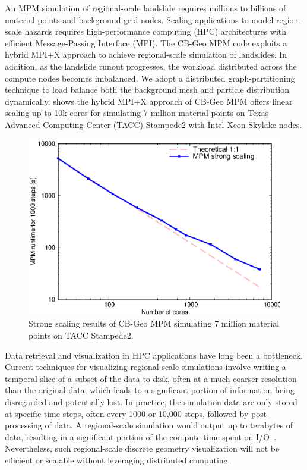 \documentclass[journal]{IEEEtran}
\begin{document}
An MPM simulation of regional-scale landslide requires millions to billions of material points and background grid nodes. Scaling applications to model region-scale hazards requires  high-performance computing (HPC) architectures with efficient Message-Passing Interface (MPI). The CB-Geo MPM code exploits a hybrid MPI+X approach to achieve regional-scale simulation of landslides. In addition, as the landslide runout progresses, the workload distributed across the compute nodes becomes imbalanced. We adopt a distributed graph-partitioning technique to load balance both the background mesh and particle distribution dynamically.   shows the hybrid MPI+X approach of CB-Geo MPM offers linear scaling up to 10k cores for simulating 7 million material points on Texas Advanced Computing Center (TACC) Stampede2 with Intel Xeon Skylake nodes. 

\begin{figure}[!htbp]
    \centering
    \includegraphics[width=\linewidth]{figs/scaling.eps}
    \caption{Strong scaling results of CB-Geo MPM simulating 7 million material points on TACC Stampede2.} 
    \label{fig:scaling}
\end{figure}

Data retrieval and visualization in HPC applications have long been a bottleneck. Current techniques for visualizing regional-scale simulations involve writing a temporal slice of a subset of the data to disk, often at a much coarser resolution than the original data, which leads to a significant portion of information being disregarded and potentially lost. In practice, the simulation data are only stored at specific time steps, often every 1000 or 10,000 steps, followed by post-processing of data. A  regional-scale simulation would output up to terabytes of data, resulting in a significant portion of the compute time spent on I/O~\cite{byna2020exahdf5}. Nevertheless, such regional-scale discrete geometry visualization will not be efficient or scalable without leveraging distributed computing. 
\end{document}
